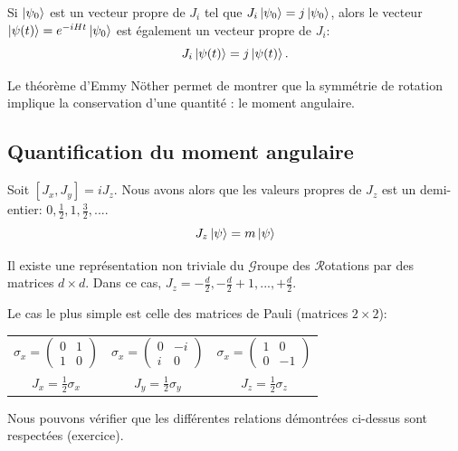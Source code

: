 \documentclass[../notesdecours.tex]{subfiles}
\begin{document}
\begin{Property}
    Si $\ket{\psi_0}$ est un vecteur propre de $J_i$ tel que $J_i\ket{\psi_0} = j\ket{\psi_0}$, alors le vecteur $\ket{\psi(t)} = e^{-iHt}\ket{\psi_0}$ est également un vecteur propre de $J_i$:
    \begin{equation}
        J_i\ket{\psi(t)} = j\ket{\psi(t)}.
    \end{equation}
\end{Property}
Le théorème d'Emmy Nöther permet de montrer que la symmétrie de rotation implique la conservation d'une quantité : le moment angulaire.


\subsection{Quantification du moment angulaire}
\begin{theorem}
Soit $[J_x,J_y] = iJ_z$. Nous avons alors que les valeurs propres de $J_z$ est un demi-entier: $0,\frac{1}{2}, 1, \frac{3}{2}, ...$.
\begin{equation*}
J_z \ket{\psi} = m\ket{\psi}
\end{equation*}
\end{theorem}

\begin{theorem}
Il existe une représentation non triviale du $\mathcal{G}$roupe des $\mathcal{R}$otations par des matrices $d\times d$. Dans ce cas, $J_z = -\frac{d}{2}, -\frac{d}{2}+1,...,+\frac{d}{2}$.
\end{theorem}
\begin{exemple}
Le cas le plus simple est celle des matrices de Pauli (matrices $2\times 2$):
\begin{center}
\begin{tabular}{c|c|c}
$\sigma_x = \begin{pmatrix}
0 & 1\\
1 & 0
\end{pmatrix}$ & $\sigma_x = \begin{pmatrix}
0 & -i\\
i & 0
\end{pmatrix}$ & $\sigma_x = \begin{pmatrix}
1 & 0\\
0 & -1
\end{pmatrix}$\\
$J_x = \frac{1}{2}\sigma_x$ & $J_y = \frac{1}{2}\sigma_y$ & $J_z = \frac{1}{2}\sigma_z$
\end{tabular}
\end{center}
Nous pouvons vérifier que les différentes relations démontrées ci-dessus sont respectées (exercice).
\end{exemple}
\end{document}
